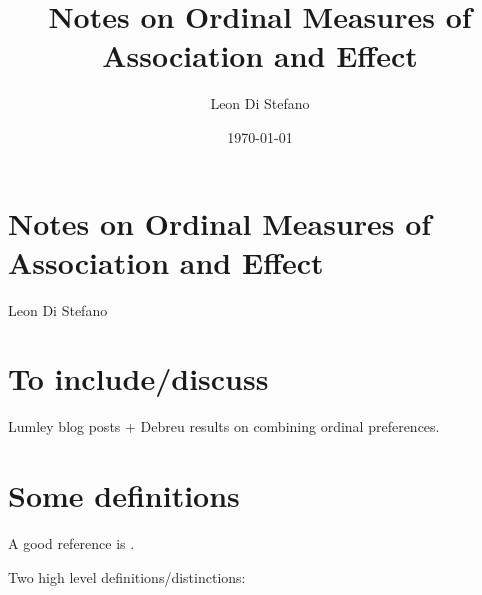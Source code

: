 \documentclass[
  11pt,
  fleqn
]{article}
\title{Notes on Ordinal Measures of Association and Effect}
\author{Leon Di Stefano}
\date{\today}
\begin{document}
\section*{Notes on Ordinal Measures of Association and Effect}
Leon Di Stefano

\section{To include/discuss}

Lumley blog posts + Debreu results on combining ordinal preferences.
\citep{
  DebreusRepresentationTheorems2024,
  lumleyOrdinalDataMetadata,
  lumleyOrdinalDataTaking,
  lumleyRockPaperScissors,
  lumleyTransitiveTestTest,
OrdinalUtility2025}

\section{Some definitions}

A good reference is \citet{kruskalOrdinalMeasuresAssociation1958}.

Two high level definitions/distinctions:
\end{document}
